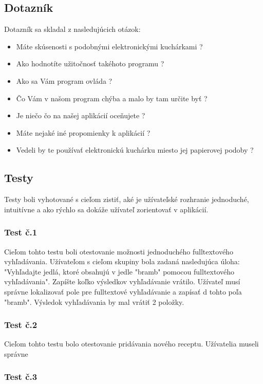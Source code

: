 \documentclass[12pt,a4paper,titlepage,final]{article}
\begin{document}
\subsection{Dotazník}
Dotazník sa skladal z nasledujúcich otázok:
\begin{itemize}
\item Máte skúsenosti s podobnými elektronickými kuchárkami ?
\item Ako hodnotíte užitočnosť takéhoto programu ?
\item Ako sa Vám program ovláda ?
\item Čo Vám v našom program chýba a malo by tam určite byť ?
\item Je niečo čo na našej aplikácií oceňujete ?
\item Máte nejaké iné propomienky k aplikácií ?
\item Vedeli by te používať elektronickú kuchárku miesto jej papierovej podoby ?

\end{itemize}

\subsection{Testy}
Testy boli vyhotované s cieľom zistiť, aké je užívateľské rozhranie jednoduché, intuitívne a ako rýchlo sa dokáže užívateľ zorientovať v aplikácií. 

\subsubsection{Test č.1}
Cieľom tohto testu boli otestovanie možnosti jednoduchého fulltextového vyhľadávania. Užívateľom s cieľom skupiny bola zadaná nasledujúca úloha: "Vyhľadajte jedlá, ktoré obsahujú v jedle "bramb" pomocou fulltextového vyhľadávania". Zapíšte koľko výsledkov vyhľadávanie vrátilo. Užívateľ musí správne lokalizovať pole pre fulltextové vyhľadávanie a zapísať d tohto poľa "bramb". Výsledok vyhľadávania by mal vrátiť 2 položky.

\subsubsection{Test č.2}
Cieľom tohto testu bolo otestovanie pridávania nového receptu. Užívatelia museli správne

\subsubsection{Test č.3}
\end{document}
